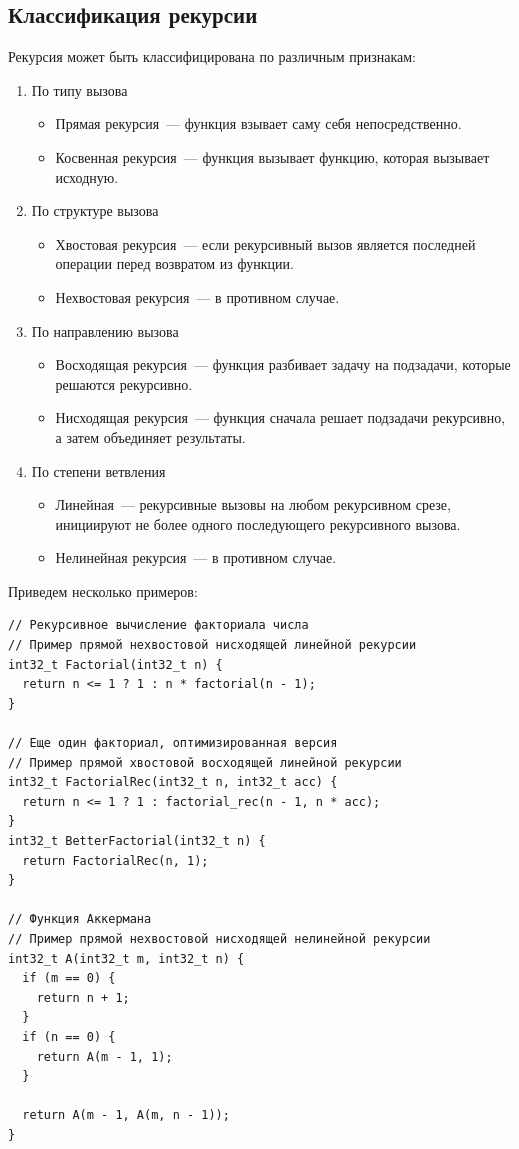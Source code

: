 \subsection{Классификация рекурсии}
Рекурсия может быть классифицирована по различным признакам:
\begin{enumerate}
  \item По типу вызова
        \begin{itemize}
          \item Прямая рекурсия~--- функция взывает саму себя непосредственно.
          \item Косвенная рекурсия~--- функция вызывает функцию, которая вызывает исходную.
        \end{itemize}
  \item По структуре вызова
        \begin{itemize}
          \item Хвостовая рекурсия~--- если рекурсивный вызов является последней операции перед возвратом из функции.
          \item Нехвостовая рекурсия~--- в противном случае.
        \end{itemize}
  \item По направлению вызова
        \begin{itemize}
          \item Восходящая рекурсия~--- функция разбивает задачу на подзадачи, которые решаются рекурсивно.
          \item Нисходящая рекурсия~--- функция сначала решает подзадачи рекурсивно, а затем объединяет результаты.
        \end{itemize}
  \item По степени ветвления
        \begin{itemize}
          \item Линейная~--- рекурсивные вызовы на любом рекурсивном срезе, инициируют не более одного последующего рекурсивного вызова.
          \item Нелинейная рекурсия~--- в противном случае.
        \end{itemize}
\end{enumerate}

Приведем несколько примеров:
\begin{verbatim}
// Рекурсивное вычисление факториала числа
// Пример прямой нехвостовой нисходящей линейной рекурсии
int32_t Factorial(int32_t n) {
  return n <= 1 ? 1 : n * factorial(n - 1);
}

// Еще один факториал, оптимизированная версия
// Пример прямой хвостовой восходящей линейной рекурсии
int32_t FactorialRec(int32_t n, int32_t acc) {
  return n <= 1 ? 1 : factorial_rec(n - 1, n * acc);
}
int32_t BetterFactorial(int32_t n) {
  return FactorialRec(n, 1);
}

// Функция Аккермана
// Пример прямой нехвостовой нисходящей нелинейной рекурсии
int32_t A(int32_t m, int32_t n) {
  if (m == 0) {
    return n + 1;
  }
  if (n == 0) {
    return A(m - 1, 1);
  }

  return A(m - 1, A(m, n - 1));
}
\end{verbatim}

